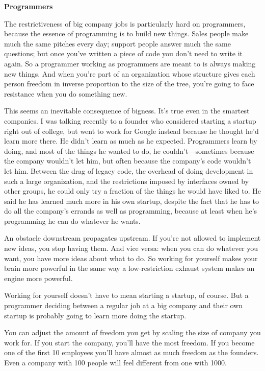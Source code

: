 \textbf{Programmers}

The restrictiveness of big company jobs is particularly hard on
programmers, because the essence of programming is to build new things.
Sales people make much the same pitches every day; support people answer
much the same questions; but once you've written a piece of code you
don't need to write it again. So a programmer working as programmers are
meant to is always making new things. And when you're part of an
organization whose structure gives each person freedom in inverse
proportion to the size of the tree, you're going to face resistance when
you do something new.

This seems an inevitable consequence of bigness. It's true even in the
smartest companies. I was talking recently to a founder who considered
starting a startup right out of college, but went to work for Google
instead because he thought he'd learn more there. He didn't learn as
much as he expected. Programmers learn by doing, and most of the things
he wanted to do, he couldn't---sometimes because the company wouldn't
let him, but often because the company's code wouldn't let him. Between
the drag of legacy code, the overhead of doing development in such a
large organization, and the restrictions imposed by interfaces owned by
other groups, he could only try a fraction of the things he would have
liked to. He said he has learned much more in his own startup, despite
the fact that he has to do all the company's errands as well as
programming, because at least when he's programming he can do whatever
he wants.

An obstacle downstream propagates upstream. If you're not allowed to
implement new ideas, you stop having them. And vice versa: when you can
do whatever you want, you have more ideas about what to do. So working
for yourself makes your brain more powerful in the same way a
low-restriction exhaust system makes an engine more powerful.

Working for yourself doesn't have to mean starting a startup, of course.
But a programmer deciding between a regular job at a big company and
their own startup is probably going to learn more doing the startup.

You can adjust the amount of freedom you get by scaling the size of
company you work for. If you start the company, you'll have the most
freedom. If you become one of the first 10 employees you'll have almost
as much freedom as the founders. Even a company with 100 people will
feel different from one with 1000.

